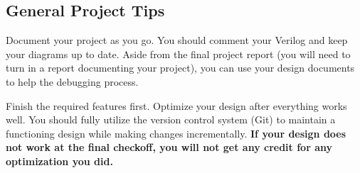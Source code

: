 \subsection{General Project Tips}
Document your project as you go.
You should comment your Verilog and keep your diagrams up to date.
Aside from the final project report (you will need to turn in a report documenting your project),
you can use your design documents to help the debugging process.

Finish the required features first.
Optimize your design after everything works well.
You should fully utilize the version control system (Git) to maintain a functioning design
while making changes incrementally.
\textbf{If your design does not work at the final checkoff, you will not get any credit for any optimization you did.}

\newpage
